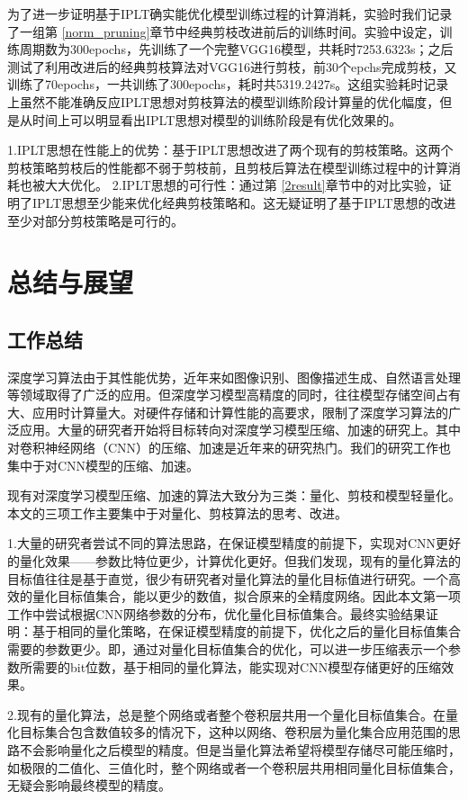 \documentclass[ pdftex, oneside, master]{NJUthesis}
\begin{document}
为了进一步证明基于IPLT确实能优化模型训练过程的计算消耗，实验时我们记录了一组第 \ref{norm_pruning}章节中经典剪枝改进前后的训练时间。实验中设定，训练周期数为300epochs，先训练了一个完整VGG16模型，共耗时7253.6323s；之后测试了利用改进后的经典剪枝\cite{17}算法对VGG16进行剪枝，前30个epchs完成剪枝，又训练了70epochs，一共训练了300epochs，耗时共5319.2427s。这组实验耗时记录上虽然不能准确反应IPLT思想对剪枝算法的模型训练阶段计算量的优化幅度，但是从时间上可以明显看出IPLT思想对模型的训练阶段是有优化效果的。


1.IPLT思想在性能上的优势：基于IPLT思想改进了两个现有的剪枝策略。这两个剪枝策略剪枝后的性能都不弱于剪枝前，且剪枝后算法在模型训练过程中的计算消耗也被大大优化。
2.IPLT思想的可行性：通过第 \ref{2result}章节中的对比实验，证明了IPLT思想至少能来优化经典剪枝策略\cite{17}和\cite{27}。这无疑证明了基于IPLT思想的改进至少对部分剪枝策略是可行的。


\chapter{总结与展望}

\section{工作总结}

深度学习算法由于其性能优势，近年来如图像识别、图像描述生成、自然语言处理等领域取得了广泛的应用。但深度学习模型高精度的同时，往往模型存储空间占有大、应用时计算量大。对硬件存储和计算性能的高要求，限制了深度学习算法的广泛应用。大量的研究者开始将目标转向对深度学习模型压缩、加速的研究上。其中对卷积神经网络（CNN）的压缩、加速是近年来的研究热门。我们的研究工作也集中于对CNN模型的压缩、加速。

现有对深度学习模型压缩、加速的算法大致分为三类：量化、剪枝和模型轻量化。本文的三项工作主要集中于对量化、剪枝算法的思考、改进。

1.大量的研究者尝试不同的算法思路，在保证模型精度的前提下，实现对CNN更好的量化效果——参数比特位更少，计算优化更好。但我们发现，现有的量化算法的目标值往往是基于直觉，很少有研究者对量化算法的量化目标值进行研究。一个高效的量化目标值集合，能以更少的数值，拟合原来的全精度网络。因此本文第一项工作中尝试根据CNN网络参数的分布，优化量化目标值集合。最终实验结果证明：基于相同的量化策略，在保证模型精度的前提下，优化之后的量化目标值集合需要的参数更少。即，通过对量化目标值集合的优化，可以进一步压缩表示一个参数所需要的bit位数，基于相同的量化算法，能实现对CNN模型存储更好的压缩效果。

2.现有的量化算法，总是整个网络或者整个卷积层共用一个量化目标值集合。在量化目标集合包含数值较多的情况下，这种以网络、卷积层为量化集合应用范围的思路不会影响量化之后模型的精度。但是当量化算法希望将模型存储尽可能压缩时，如极限的二值化\cite{binary}、三值化\cite{ternary}时，整个网络或者一个卷积层共用相同量化目标值集合，无疑会影响最终模型的精度。
\end{document}
